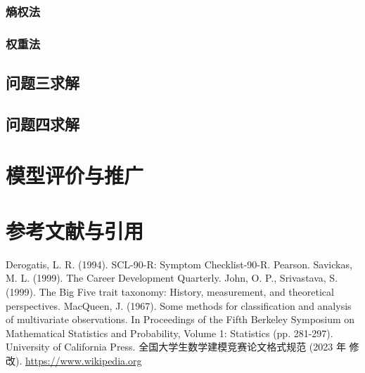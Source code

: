 \documentclass[withoutpreface,bwprint]{cumcmthesis} %
\begin{document}
\subsubsection{熵权法}

\subsubsection{权重法}

\subsection{问题三求解}

\subsection{问题四求解}


\section{模型评价与推广}
\section{参考文献与引用}

\begin{thebibliography}{9}%
     Derogatis, L. R. (1994). SCL-90-R: Symptom Checklist-90-R. Pearson.
     Savickas, M. L. (1999). The Career Development Quarterly.
     John, O. P., Srivastava, S. (1999). The Big Five trait taxonomy: History, measurement, and theoretical perspectives.
    MacQueen, J. (1967). Some methods for classification and analysis of multivariate observations. In Proceedings of the Fifth Berkeley Symposium on Mathematical Statistics and Probability, Volume 1: Statistics (pp. 281-297). University of California Press.
        全国大学生数学建模竞赛论文格式规范 (2023 年 修改).
     \url{https://www.wikipedia.org}
\end{thebibliography}
\end{document}
